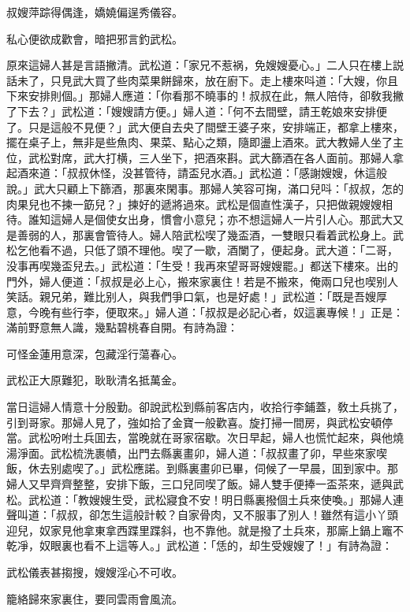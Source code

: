 \begin{myquote}
叔嫂萍踪得偶逢，嬌嬈偏逞秀儀容。

私心便欲成歡會，暗把邪言釣武松。
\end{myquote}

原來這婦人甚是言語撇清。武松道：「家兄不惹祸，免嫂嫂憂心。」二人只在樓上説話未了，只見武大買了些肉菜果餅歸來，放在廚下。走上樓來呌道：「大嫂，你且下來安排則個。」那婦人應道：「你看那不曉事的！叔叔在此，無人陪侍，卻敎我撇了下去？」武松道：「嫂嫂請方便。」婦人道：「何不去間壁，請王乾娘來安排便了。只是這般不見便？」武大便自去央了間壁王婆子來，安排端正，都拿上樓來，擺在桌子上，無非是些魚肉、果菜、點心之類，隨即盪上酒來。武大教婦人坐了主位，武松對席，武大打横，三人坐下，把酒來斟。武大篩酒在各人面前。那婦人拿起酒來道：「叔叔休怪，没甚管待，請盃兒水酒。」武松道：「感謝嫂嫂，休這般說。」武大只顧上下篩酒，那裏來閑事。那婦人笑容可掬，滿口兒呌：「叔叔，怎的肉果兒也不揀一筯兒？」揀好的遞將過來。武松是個直性漢子，只把做親嫂嫂相待。誰知這婦人是個使女出身，慣會小意兒；亦不想這婦人一片引人心。那武大又是善弱的人，那裏會管待人。婦人陪武松喫了幾盃酒，一雙眼只看着武松身上。武松乞他看不過，只低了頭不理他。喫了一歇，酒闌了，便起身。武大道：「二哥，没事再喫幾盃兒去。」武松道：「生受！我再來望哥哥嫂嫂罷。」都送下樓來。出的門外，婦人便道：「叔叔是必上心，搬來家裏住！若是不搬來，俺兩口兒也喫别人笑話。親兄弟，難比别人，與我們爭口氣，也是好處！」武松道：「既是吾嫂厚意，今晚有些行李，便取來。」婦人道：「叔叔是必記心者，奴這裏專候！」正是：滿前野意無人識，幾點碧桃春自開。有詩為證：

\begin{myquote}
可怪金蓮用意深，包藏淫行蕩春心。

武松正大原難犯，耿耿清名抵萬金。
\end{myquote}

當日這婦人情意十分殷勤。卻說武松到縣前客店内，收拾行李鋪蓋，敎土兵挑了，引到哥家。那婦人見了，強如拾了金寶一般歡喜。旋打掃一間房，與武松安頓停當。武松吩咐土兵囬去，當晚就在哥家宿歇。次日早起，婦人也慌忙起來，與他燒湯淨面。武松梳洗裹幘，出門去縣裏畫卯，婦人道：「叔叔畫了卯，早些來家喫飯，休去别處喫了。」武松應諾。到縣裏畫卯已畢，伺候了一早晨，囬到家中。那婦人又早齊齊整整，安排下飯，三口兒同喫了飯。婦人雙手便捧一盃茶來，遞與武松。武松道：「教嫂嫂生受，武松寢食不安！明日縣裏撥個土兵來使喚。」那婦人連聲叫道：「叔叔，卻怎生這般計較？自家骨肉，又不服事了別人！雖然有這小丫頭迎兒，奴家見他拿東拿西蹀里蹀斜，也不靠他。就是撥了土兵來，那廝上鍋上竈不乾凈，奴眼裏也看不上這等人。」武松道：「恁的，却生受嫂嫂了！」有詩為證：

\begin{myquote}
武松儀表甚搊搜，嫂嫂淫心不可收。

籠絡歸來家裏住，要同雲雨會風流。
\end{myquote}

